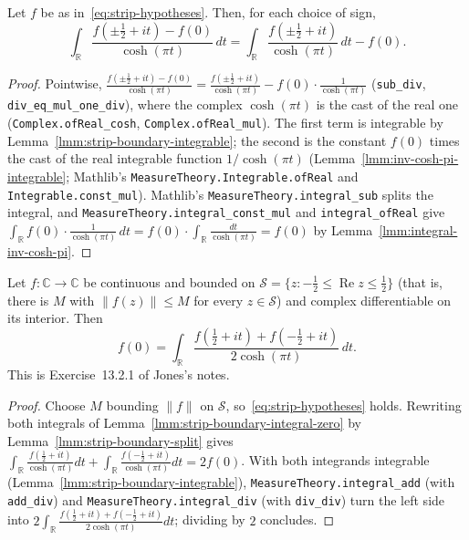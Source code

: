 \begin{lemma}
    \label{lmm:strip-boundary-split}
    \leanok
    Let $f$ be as in~\eqref{eq:strip-hypotheses}. Then, for each choice of sign,
    \[ \int_{\mathbb{R}} \frac{f(\pm\tfrac{1}{2} + it) - f(0)}{\cosh(\pi t)} \, dt = \int_{\mathbb{R}} \frac{f(\pm\tfrac{1}{2} + it)}{\cosh(\pi t)} \, dt - f(0). \]
\end{lemma}
\begin{proof}
    \leanok
    Pointwise, $\frac{f(\pm\frac{1}{2} + it) - f(0)}{\cosh(\pi t)} = \frac{f(\pm\frac{1}{2} + it)}{\cosh(\pi t)} - f(0) \cdot \frac{1}{\cosh(\pi t)}$ (\texttt{sub\_div}, \texttt{div\_eq\_mul\_one\_div}), where the complex $\cosh(\pi t)$ is the cast of the real one (\texttt{Complex.ofReal\_cosh}, \texttt{Complex.ofReal\_mul}). The first term is integrable by Lemma~\ref{lmm:strip-boundary-integrable}; the second is the constant $f(0)$ times the cast of the real integrable function $1/\cosh(\pi t)$ (Lemma~\ref{lmm:inv-cosh-pi-integrable}; Mathlib's \texttt{MeasureTheory.Integrable.ofReal} and \texttt{Integrable.const\_mul}). Mathlib's \texttt{MeasureTheory.integral\_sub} splits the integral, and \texttt{MeasureTheory.integral\_const\_mul} and \texttt{integral\_ofReal} give $\int_{\mathbb{R}} f(0) \cdot \frac{1}{\cosh(\pi t)} \, dt = f(0) \cdot \int_{\mathbb{R}} \frac{dt}{\cosh(\pi t)} = f(0)$ by Lemma~\ref{lmm:integral-inv-cosh-pi}.
\end{proof}

\begin{theorem}
    \label{thrm:strip-formula}
    \leanok
    Let $f : \mathbb{C} \to \mathbb{C}$ be continuous and bounded on $\mathcal{S} = \{z : -\tfrac{1}{2} \le \operatorname{Re} z \le \tfrac{1}{2}\}$ (that is, there is $M$ with $\|f(z)\| \le M$ for every $z \in \mathcal{S}$) and complex differentiable on its interior. Then
    \[ f(0) = \int_{\mathbb{R}} \frac{f(\tfrac{1}{2} + it) + f(-\tfrac{1}{2} + it)}{2\cosh(\pi t)} \, dt. \]
    This is Exercise~13.2.1 of Jones's notes.
\end{theorem}
\begin{proof}
    \leanok
    Choose $M$ bounding $\|f\|$ on $\mathcal{S}$, so~\eqref{eq:strip-hypotheses} holds. Rewriting both integrals of Lemma~\ref{lmm:strip-boundary-integral-zero} by Lemma~\ref{lmm:strip-boundary-split} gives $\int_{\mathbb{R}} \frac{f(\frac{1}{2} + it)}{\cosh(\pi t)}dt + \int_{\mathbb{R}} \frac{f(-\frac{1}{2} + it)}{\cosh(\pi t)}dt = 2f(0)$. With both integrands integrable (Lemma~\ref{lmm:strip-boundary-integrable}), \texttt{MeasureTheory.integral\_add} (with \texttt{add\_div}) and \texttt{MeasureTheory.integral\_div} (with \texttt{div\_div}) turn the left side into $2\int_{\mathbb{R}} \frac{f(\frac{1}{2} + it) + f(-\frac{1}{2} + it)}{2\cosh(\pi t)} dt$; dividing by $2$ concludes.
\end{proof}

